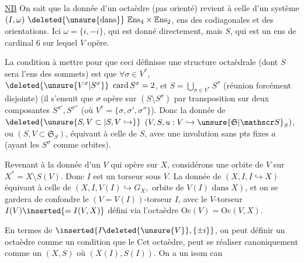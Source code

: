 
\uline{NB} On sait que la donnée d'un octaèdre  (pas orienté) revient à celle d'un système $(I,\omega)\ \deleted{\unsure{\text{dans}}}\ \mathbb{E}\mathrm{ns}_4\times\mathbb{E}\mathrm{ns}_2$, ens des codiagonales et des orientations. Ici $\omega=\{i,-i\}$,   qui est donné directement, mais $S$, qui est un ens de  cardinal 6 sur lequel $V$ opère.

La condition à mettre  pour que ceci définisse une  structure octaèdrale (dont $S$ sera l'ens des sommets) est que $\forall\sigma\in V^*$, $\deleted{\unsure{V^\sigma|S^\sigma}}\ \operatorname{card}S^\sigma=2$, et $S=\bigcup_{\sigma\in V^*}S^\sigma$ (réunion forcément disjointe) (il s'ensuit que $\sigma$ opère sur $(S\setminus S^\sigma)$ par transposition sur  deux composantes $S^{\sigma'},S^{\sigma''}$ (où $V^*=\{\sigma,\sigma',\sigma''\}$). Donc la donnée de $\deleted{\unsure{S,V\subset|S,V\hookrightarrow}}$ $(V,S,u:V\hookrightarrow\unsure{\mathfrak S|\mathscr S}_S)$, ou $(S,V\subset\mathfrak S_S)$, équivaut à celle de $S$, avec une involution sans pts fixes $a$ (ayant les $S^\sigma$ comme orbites).

Revenant à la donnée d'un $V$ qui opère  sur $X$, considérons une orbite  de $V$ sur $X^*=X\setminus S(V)$. Donc $I$ est un torseur sous $V$. La donnée de $(X,I,I\hookrightarrow X)$ équivaut à celle de $(X,I,V(I)\hookrightarrow G_X,\text{ orbite de }V(I)\text{ dans }X)$, et on se gardera de confondre le $(V=V(I))$-torseur $I$, avec le $V$-torseur $I(V)\inserted{=I(V,X)}$ défini via l'octaèdre $\mathrm{Oc}(V)=\mathrm{Oc}(V,X)$.

En termes de $\inserted{I\deleted{\unsure{V}},\{\pm i\}}$, on peut définir un octaèdre  comme un  condition que le     Cet  octaèdre,  peut se réaliser canoniquement  comme un $(X,S)$ où $(X(I),S(I))$. On a un isom can
